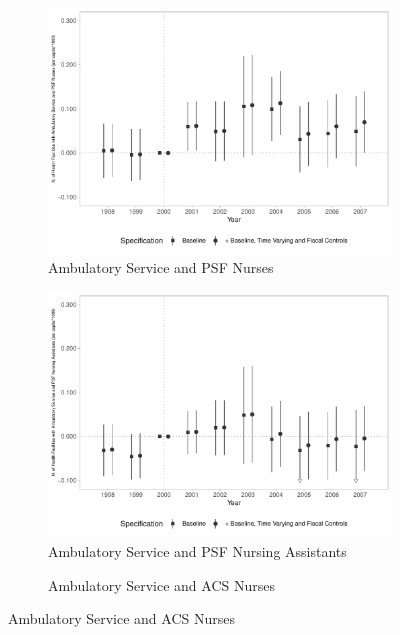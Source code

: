 \begin{figure}[h!]
\begin{center}
\begin{subfigure}{0.32\textwidth}
        \centering
        \caption{\scriptsize Ambulatory Service and PSF Nurses}\label{fig:12e}
        \includegraphics[width=\textwidth]{plots/sia_ncnes_enfpsf_pcapita_dist_ec29_baseline_dist_ec29_baseline_12.pdf}
    \end{subfigure}
        \begin{subfigure}{0.32\textwidth}
        \caption{\scriptsize Ambulatory Service and PSF Nursing Assistants}\label{fig:12f}
        \centering
        \includegraphics[width=\textwidth]{plots/sia_ncnes_outpsf_pcapita_dist_ec29_baseline_dist_ec29_baseline_12.pdf}
    \end{subfigure}
    \begin{subfigure}{0.32\textwidth}
        \centering
        \caption{\scriptsize Ambulatory Service and ACS Nurses}\label{fig:12g}

\end{subfigure}
\end{center}
\end{figure}
